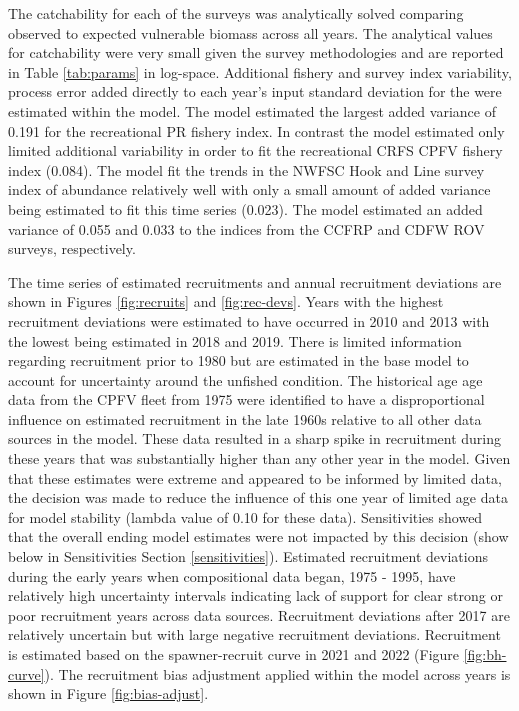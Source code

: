\documentclass[11pt,
  english,
  letterpaper,
]{article}
\begin{document}
The catchability for each of the surveys was analytically solved comparing observed to expected vulnerable biomass across all years. The analytical values for catchability were very small given the survey methodologies and are reported in Table \ref{tab:params} in log-space. Additional fishery and survey index variability, process error added directly to each year's input standard deviation for the were estimated within the model. The model estimated the largest added variance of 0.191 for the recreational PR fishery index. In contrast the model estimated only limited additional variability in order to fit the recreational CRFS CPFV fishery index (0.084). The model fit the trends in the NWFSC Hook and Line survey index of abundance relatively well with only a small amount of added variance being estimated to fit this time series (0.023). The model estimated an added variance of 0.055 and 0.033 to the indices from the CCFRP and CDFW ROV surveys, respectively.

The time series of estimated recruitments and annual recruitment deviations are shown in Figures \ref{fig:recruits} and \ref{fig:rec-devs}. Years with the highest recruitment deviations were estimated to have occurred in 2010 and 2013 with the lowest being estimated in 2018 and 2019. There is limited information regarding recruitment prior to 1980 but are estimated in the base model to account for uncertainty around the unfished condition. The historical age age data from the CPFV fleet from 1975 were identified to have a disproportional influence on estimated recruitment in the late 1960s relative to all other data sources in the model. These data resulted in a sharp spike in recruitment during these years that was substantially higher than any other year in the model. Given that these estimates were extreme and appeared to be informed by limited data, the decision was made to reduce the influence of this one year of limited age data for model stability (lambda value of 0.10 for these data). Sensitivities showed that the overall ending model estimates were not impacted by this decision (show below in Sensitivities Section \ref{sensitivities}). Estimated recruitment deviations during the early years when compositional data began, 1975 - 1995, have relatively high uncertainty intervals indicating lack of support for clear strong or poor recruitment years across data sources. Recruitment deviations after 2017 are relatively uncertain but with large negative recruitment deviations. Recruitment is estimated based on the spawner-recruit curve in 2021 and 2022 (Figure \ref{fig:bh-curve}). The recruitment bias adjustment applied within the model across years is shown in Figure \ref{fig:bias-adjust}.
\end{document}
